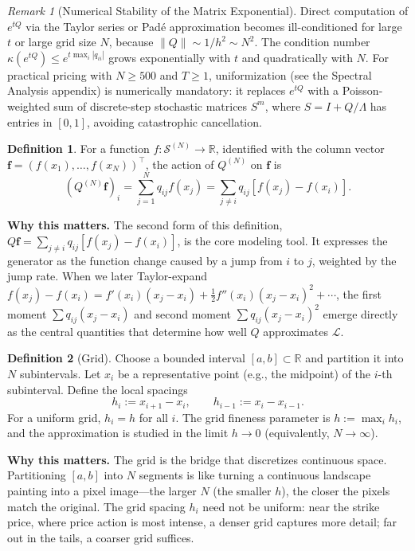 \documentclass[11pt,a4paper,openany]{book}
\theoremstyle{definition}
\newtheorem{definition}{Definition}[chapter]
\theoremstyle{plain}
\theoremstyle{remark}
\newtheorem{remark}[theorem]{Remark}
\newcommand{\1}{\mathbbm{1}}
\newcommand{\R}{\mathbb{R}}
\newcommand{\calS}{\mathcal{S}}
\begin{document}
\begin{remark}[Numerical Stability of the Matrix Exponential]
Direct computation of $e^{tQ}$ via the Taylor series or Pad\'e approximation becomes ill-conditioned for large $t$ or large grid size $N$, because $\|Q\| \sim 1/h^{2} \sim N^{2}$. The condition number $\kappa(e^{tQ}) \leq e^{t \max_{i}|q_{ii}|}$ grows exponentially with $t$ and quadratically with $N$. For practical pricing with $N \geq 500$ and $T \geq 1$, uniformization (see the Spectral Analysis appendix) is numerically mandatory: it replaces $e^{tQ}$ with a Poisson-weighted sum of discrete-step stochastic matrices $S^{m}$, where $S = I + Q/\Lambda$ has entries in $[0,1]$, avoiding catastrophic cancellation.
\end{remark}

\begin{definition}
For a function $f: \calS^{(N)} \to \R$, identified with the column vector $\mathbf{f} = (f(x_{1}), \ldots, f(x_{N}))^{\top}$, the action of $Q^{(N)}$ on $\mathbf{f}$ is
\[
(Q^{(N)} \mathbf{f})_{i} = \sum_{j=1}^{N} q_{ij} f(x_{j}) = \sum_{j \neq i} q_{ij} [f(x_{j}) - f(x_{i})].
\]
\end{definition}

\medskip
\noindent\textbf{Why this matters.} The second form of this definition, $Q \mathbf{f} = \sum_{j \neq i} q_{ij}[f(x_j) - f(x_i)]$, is the core modeling tool. It expresses the generator as the function change caused by a jump from $i$ to $j$, weighted by the jump rate. When we later Taylor-expand $f(x_j) - f(x_i) = f'(x_i)(x_j-x_i) + \frac{1}{2}f''(x_i)(x_j-x_i)^2 + \cdots$, the first moment $\sum q_{ij}(x_j-x_i)$ and second moment $\sum q_{ij}(x_j-x_i)^2$ emerge directly as the central quantities that determine how well $Q$ approximates $\mathcal{L}$.

\begin{definition}[Grid]
Choose a bounded interval $[a, b] \subset \R$ and partition it into $N$ subintervals. Let $x_{i}$ be a representative point (e.g., the midpoint) of the $i$-th subinterval. Define the local spacings
\[
h_{i} := x_{i+1} - x_{i}, \qquad h_{i-1} := x_{i} - x_{i-1}.
\]
For a uniform grid, $h_{i} = h$ for all $i$. The grid fineness parameter is $h := \max_{i} h_{i}$, and the approximation is studied in the limit $h \to 0$ (equivalently, $N \to \infty$).
\end{definition}

\medskip
\noindent\textbf{Why this matters.} The grid is the bridge that discretizes continuous space. Partitioning $[a,b]$ into $N$ segments is like turning a continuous landscape painting into a pixel image---the larger $N$ (the smaller $h$), the closer the pixels match the original. The grid spacing $h_i$ need not be uniform: near the strike price, where price action is most intense, a denser grid captures more detail; far out in the tails, a coarser grid suffices.
\end{document}
